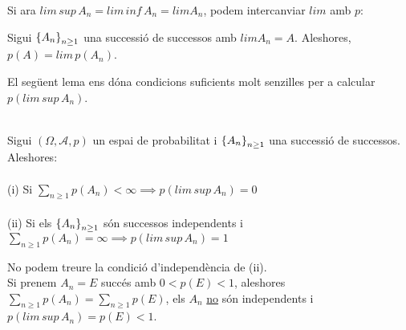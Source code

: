 Si ara $lim \, sup\, A_{n} = lim\, inf\, A_{n} = lim A_{n}$, podem intercanviar $lim$ amb $p$:

\begin{prop}
  Sigui $\left\{A_{n}\right\}_{n\geq 1}$ una successió de successos amb $lim A_{n} = A$. Aleshores, 
  $p(A) = lim \, p(A_{n})$. \\
\end{prop}

El següent lema ens dóna condicions suficients molt senzilles per a calcular $p(lim \, sup \, A_{n})$.

\begin{lema}
  \- \\
  Sigui $(\Omega, \mathcal{A}, p)$ un espai de probabilitat i $\left\{A_{n}\right\}_{n\geq 1}$ una 
  successió de successos. Aleshores: \\\\
  
  (i) Si $\sum\limits_{n\geq 1}p(A_{n}) < \infty \implies p(lim \, sup \, A_{n}) = 0$ \\\\
  
  (ii) Si els $\left\{A_{n}\right\}_{n\geq 1}$ són successos independents i $\sum\limits_{n\geq 1}p(A_{n}) 
  = \infty \implies p(lim \, sup \, A_{n}) = 1$
\end{lema}

\begin{obs}
  No podem treure la condició d'independència de (ii). \\
  Si prenem $A_{n} = E$ succés amb $0 < p(E) < 1$, aleshores $\sum\limits_{n\geq 1}p(A_{n}) 
  = \sum\limits_{n\geq 1}p(E)$, els $A_{n}$ \underline{no} són independents i  $p(lim \, sup \, A_{n}) = p(E) < 1$.
\end{obs}
